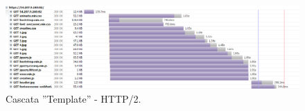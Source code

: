 \begin{apendicesenv}
\begin{landscape}
	\begin{figure}[!htb]
	    \centering
	    \caption{Cascata ''Template'' - HTTP/2.}
	    \includegraphics[width=1.5\textwidth]{./04-figuras/cascatas/template_http2}
	\end{figure}
\end{landscape}


\end{apendicesenv}